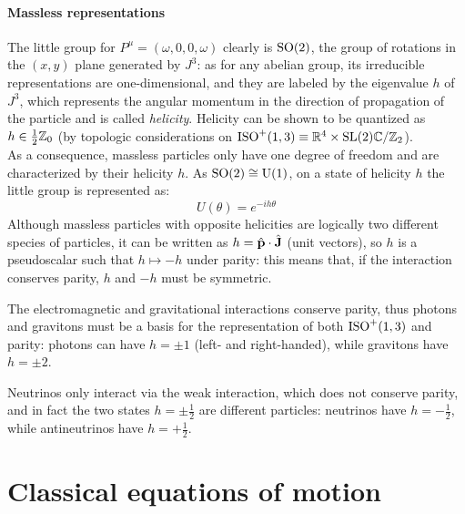 \paragraph{Massless representations}

The little group for $ P^\mu = (\omega,0,0,\omega) $ clearly is $ \mathrm{SO}(2) $, the group of rotations in the $ (x,y) $ plane generated by $ J^3 $: as for any abelian group, its irreducible representations are one-dimensional, and they are labeled by the eigenvalue $ h $ of $ J^3 $, which represents the angular momentum in the direction of propagation of the particle and is called \textit{helicity}. Helicity can be shown to be quantized as $ h \in \frac{1}{2}\mathbb{Z}_0 $ (by topologic considerations on $ \mathrm{ISO}^+(1,3) \equiv \mathbb{R}^4 \times \mathrm{SL}(2){\mathbb{C}} / \mathbb{Z}_2 $).\\
As a consequence, massless particles only have one degree of freedom and are characterized by their helicity $ h $. As $ \mathrm{SO}(2) \cong \mathrm{U}(1) $, on a state of helicity $ h $ the little group is represented as:
\begin{equation}
  U(\theta) = e^{-i h \theta}
\end{equation}
Although massless particles with opposite helicities are logically two different species of particles, it can be written as $ h = \hat{\mathbf{p}} \cdot \hat{\mathbf{J}} $ (unit vectors), so $ h $ is a pseudoscalar such that $ h \mapsto -h $ under parity: this means that, if the interaction conserves parity, $ h $ and $ -h $ must be symmetric.

\begin{example}{}{}
  The electromagnetic and gravitational interactions conserve parity, thus photons and gravitons must be a basis for the representation of both $ \mathrm{ISO}^+(1,3) $ and parity: photons can have $ h = \pm 1 $ (left- and right-handed), while gravitons have $ h = \pm 2 $.
\end{example}

\begin{example}{}{}
  Neutrinos only interact via the weak interaction, which does not conserve parity, and in fact the two states $ h = \pm \frac{1}{2} $ are different particles: neutrinos have $ h = - \frac{1}{2} $, while antineutrinos have $ h = + \frac{1}{2} $.
\end{example}

\section{Classical equations of motion}

